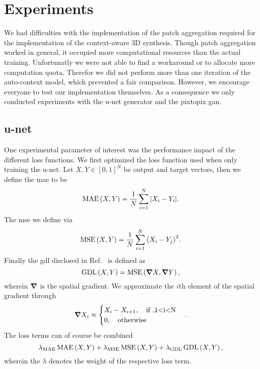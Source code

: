 \section{Experiments}

We had difficulties with the implementation of the patch aggregation required
for the implementation of the context-aware 3D synthesis. Though patch
aggregation worked in general, it occupied more computational resources than
the actual training. Unfortunatly we were not able to find a workaround or to
allocate more computation quota. Therefor we did not perform more than one
iteration of the auto-context model, which prevented a fair comparison.
However, we encourage everyone to test our implementation themselves.
As a consequence we only conducted experiments with the u-net generator and
the pixtopix \gls{gan}.

\subsection{u-net}

One experimental parameter of interest was the performance impact of the
different loss functions. We first optimized the loss function used when
only training the u-net. Let $X,Y\in{[0,1]}^N$ be output and target vectors,
then we define the \gls{mae} to be
\begin{equation}
  \operatorname{MAE}\left(X,Y\right)
  =
  \frac{1}{N}\sum_{i=1}^N
  \abs{X_i-Y_i}
  \label{eq:mae}.
\end{equation}
The \gls{mse} we define via
\begin{equation}
  \operatorname{MSE}\left(X,Y\right)
  =
  \frac{1}{N}\sum_{i=1}^N
  {\left(X_i-Y_j\right)}^2
  \label{eq:mse}.
\end{equation}
Finally the \gls{gdl} disclosed in Ref.~\cite{Nie16} is defined as
\begin{equation}
  \operatorname{GDL}\left(X,Y\right)
  =
  \operatorname{MSE}\left(\grad X,\grad Y\right)
  \label{eq:gdl},
\end{equation}
wherein $\grad$ is the spatial gradient. We approximate the $i$th element
of the spatial gradient through
\begin{equation}
  \grad X_i
  \approx
  \begin{cases}
    X_i-X_{i+1}\qc\text{if }, $1<i<N$\\
    0\qc\text{otherwise}
  \end{cases}
  \label{eq:grad}.
\end{equation}
The loss terms can of course be combined
\begin{equation}
  \lambda_\text{MAE}\operatorname{MAE}\left(X,Y\right)
  +
  \lambda_\text{MSE}\operatorname{MSE}\left(X,Y\right)
  +
  \lambda_\text{GDL}\operatorname{GDL}\left(X,Y\right),
\end{equation}
wherein the $\lambda$ denotes the weight of the respective loss term.

